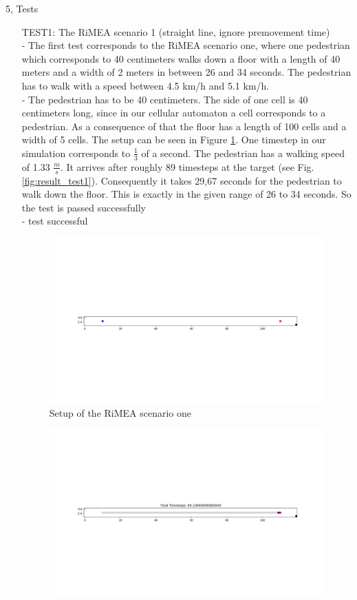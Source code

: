 \documentclass[10pt,a4paper]{article}
\begin{document}
\begin{task}{5, Tests}
\begin{enumerate}
\item[TEST1:] The RiMEA scenario 1 (straight line, ignore premovement time)\\
- The first test corresponds to the RiMEA scenario one, where one pedestrian which corresponds to 40 centimeters walks down a floor with a length of 40 meters and a width of 2 meters in between 26 and 34 seconds. The pedestrian has to walk with a speed between 4.5 km/h and 5.1 km/h. \\
- The pedestrian has to be 40 centimeters. The side of one cell is 40 centimeters long, since in our cellular automaton a cell corresponds to a pedestrian. As a consequence of that the floor has a length of 100 cells and a width of 5 cells. The setup can be seen in Figure \ref{fig:setup_test1}. One timestep in our simulation corresponds to $\frac{1}{3}$ of a second. The pedestrian has a walking speed of 1.33 $\frac{m}{s}$. It arrives after roughly 89 timesteps at the target (see Fig. \ref{fig:result_test1}). Consequently it takes 29,67 seconds for the pedestrian to walk down the floor. This is exactly in the given range of 26 to 34 seconds. So the test is passed successfully \\
- test successful
\begin{figure}
    \centering
    \includegraphics[width=\textwidth]{pictures/Test1start.png}
    \caption{Setup of the RiMEA scenario one}
    \label{fig:setup_test1}
\end{figure}
\begin{figure}
    \centering
    \includegraphics[width=\textwidth]{pictures/test1_end.png}

\end{figure}
\end{enumerate}
\end{task}
\end{document}
